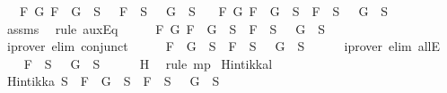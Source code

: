 \begin{isabellebody}
\ \ {\isasymand}\ {\isacharparenleft}{\isasymforall}F\ G{\isachardot}\ \isactrlbold {\isasymnot}{\isacharparenleft}F\ \isactrlbold {\isasymor}\ G{\isacharparenright}\ {\isasymin}\ S\ {\isasymlongrightarrow}\ \isactrlbold {\isasymnot}\ F\ {\isasymin}\ S\ {\isasymand}\ \isactrlbold {\isasymnot}\ G\ {\isasymin}\ S{\isacharparenright}\isanewline
\ \ {\isasymand}\ {\isacharparenleft}{\isasymforall}F\ G{\isachardot}\ \isactrlbold {\isasymnot}{\isacharparenleft}F\ \isactrlbold {\isasymrightarrow}\ G{\isacharparenright}\ {\isasymin}\ S\ {\isasymlongrightarrow}\ F\ {\isasymin}\ S\ {\isasymand}\ \isactrlbold {\isasymnot}\ G\ {\isasymin}\ S{\isacharparenright}{\isachardoublequoteclose}\isanewline
\ \ \ \isamarkupfalse%
\ assms\ \isamarkupfalse%
\ {\isacharparenleft}rule\ auxEq{\isacharparenright}\isanewline
\ \ \isamarkupfalse%
\ \isamarkupfalse%
\ {\isachardoublequoteopen}{\isasymforall}F\ G{\isachardot}\ \isactrlbold {\isasymnot}{\isacharparenleft}F\ \isactrlbold {\isasymrightarrow}\ G{\isacharparenright}\ {\isasymin}\ S\ {\isasymlongrightarrow}\ F\ {\isasymin}\ S\ {\isasymand}\ \isactrlbold {\isasymnot}\ G\ {\isasymin}\ S{\isachardoublequoteclose}\isanewline
\ \ \ \ \isamarkupfalse%
\ {\isacharparenleft}iprover\ elim{\isacharcolon}\ conjunct{}{\isacharparenright}\isanewline
\ \ \isamarkupfalse%
\ \isamarkupfalse%
\ {\isachardoublequoteopen}\isactrlbold {\isasymnot}{\isacharparenleft}F\ \isactrlbold {\isasymrightarrow}\ G{\isacharparenright}\ {\isasymin}\ S\ {\isasymlongrightarrow}\ F\ {\isasymin}\ S\ {\isasymand}\ \isactrlbold {\isasymnot}\ G\ {\isasymin}\ S{\isachardoublequoteclose}\isanewline
\ \ \ \ \isamarkupfalse%
\ {\isacharparenleft}iprover\ elim{\isacharcolon}\ allE{\isacharparenright}\isanewline
\ \ \isamarkupfalse%
\ {\isachardoublequoteopen}F\ {\isasymin}\ S\ {\isasymand}\ \isactrlbold {\isasymnot}\ G\ {\isasymin}\ S{\isachardoublequoteclose}\isanewline
\ \ \ \ \isamarkupfalse%
\ H\ \isamarkupfalse%
\ {\isacharparenleft}rule\ mp{\isacharparenright}\isanewline
{}\isamarkupfalse%
%
\endisatagproof
{\isafoldproof}%
%
\isadelimproof
\isanewline
%
\endisadelimproof
\isanewline
{}\isamarkupfalse%
\ Hintikka{\isacharunderscore}l{}{\isacharcolon}\ \isanewline
\ {\isachardoublequoteopen}Hintikka\ S\ {\isasymLongrightarrow}\ \isactrlbold {\isasymnot}{\isacharparenleft}F\ \isactrlbold {\isasymrightarrow}\ G{\isacharparenright}\ {\isasymin}\ S\ {\isasymlongrightarrow}\ F\ {\isasymin}\ S\ {\isasymand}\ \isactrlbold {\isasymnot}\ G\ {\isasymin}\ S{\isachardoublequoteclose}\isanewline

\end{isabellebody}
